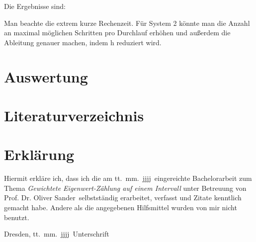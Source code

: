 \documentclass[a4paper,12pt]{report}
\newcommand{\betreuer}{Prof. Dr. Oliver Sander}
\newcommand{\thema}{Gewichtete Eigenwert-Zählung auf einem Intervall}
\newcommand{\datum}{tt.\ mm.\ jjjj} %
\newcommand{\1}{\mathds{1}}
\theoremstyle{plain} %
\theoremstyle{definition} %
\theoremstyle{remark}
\begin{document}
            Die Ergebnisse sind:

            Man beachte die extrem kurze Rechenzeit.
            Für System 2 könnte man die Anzahl an maximal möglichen Schritten pro Durchlauf erhöhen und außerdem die Ableitung genauer machen, indem h reduziert wird.
\chapter{Auswertung}
\label{sec: Auswertung}

\chapter{Literaturverzeichnis}

      \printbibliography

\chapter*{Erkl\"{a}rung}
\thispagestyle{empty}
Hiermit erkl\"{a}re ich, dass ich die am \datum\ eingereichte Bachelorarbeit zum Thema
\emph{\thema} unter Betreuung von \betreuer\ selbstst\"{a}ndig erarbeitet,
verfasst und Zitate kenntlich gemacht habe. Andere als die angegebenen Hilfsmittel
wurden von mir nicht benutzt.

\bigskip \bigskip \bigskip \bigskip \bigskip

Dresden, \datum\ \hfill Unterschrift

\normalsize
\end{document}
